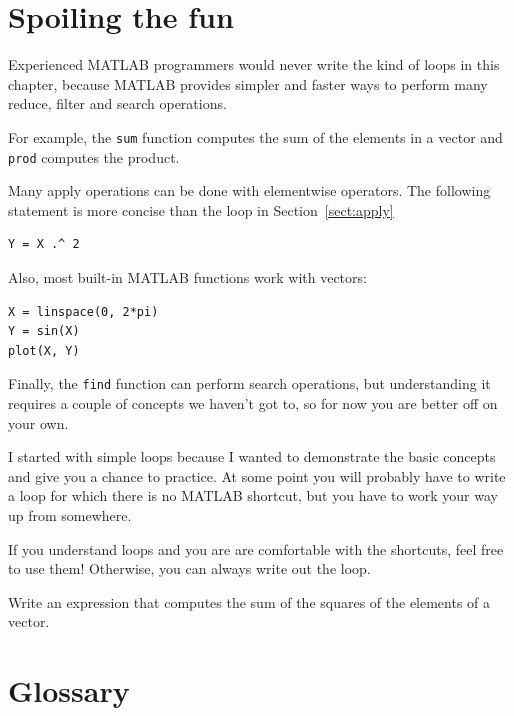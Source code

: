 \documentclass[
]{book}
\begin{document}
\section{Spoiling the fun}

Experienced MATLAB programmers would never write the kind of loops
in this chapter, because MATLAB provides simpler and faster ways to
perform many reduce, filter and search operations.

For example, the {\tt sum} function computes the sum of the elements
in a vector and {\tt prod} computes the product.

Many apply operations can be done with elementwise operators.  The
following statement is more concise than the loop in
Section~\ref{sect:apply}

\begin{verbatim}
Y = X .^ 2
\end{verbatim}

Also, most built-in MATLAB functions work with vectors:

\begin{verbatim}
X = linspace(0, 2*pi)
Y = sin(X)
plot(X, Y)
\end{verbatim}

Finally, the {\tt find} function can perform search operations, but
understanding it requires a couple of concepts we haven't got to, so
for now you are better off on your own.

I started with simple loops because I wanted to demonstrate the basic
concepts and give you a chance to practice.  At some point you will
probably have to write a loop for which there is no
MATLAB shortcut, but you have to work your way up from somewhere.

If you understand loops and you are are comfortable with the
shortcuts, feel free to use them!  Otherwise, you can always write
out the loop.

\begin{ex}
Write an expression that computes the sum of the
squares of the elements of a vector.
\end{ex}


\section{Glossary}
\end{document}
